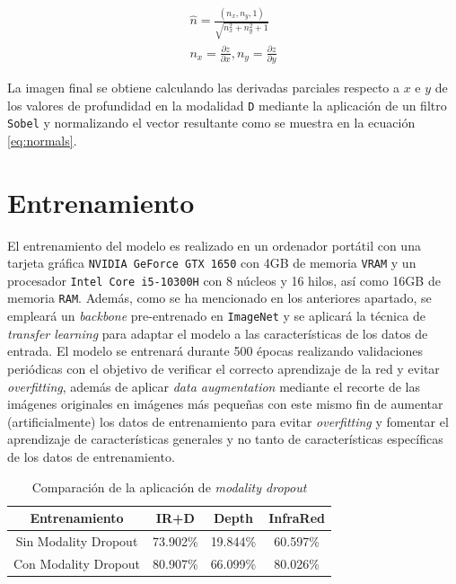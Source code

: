 \documentclass[12pt,a4paper]{report}
\begin{document}
\begin{equation}
    \begin{aligned}
        \hat{n} = \frac{(n_x, n_y, 1)}{\sqrt{n_x^2 + n_y^2 + 1}} \\
        n_x = \frac{\partial z}{\partial x}, n_y = \frac{\partial z}{\partial y} 
    \end{aligned}
    \label{eq:normals}
\end{equation}

La imagen final se obtiene calculando las derivadas parciales respecto a $x$ e $y$ de los valores de profundidad en la modalidad \texttt{D} mediante la aplicación de un filtro \texttt{Sobel} y normalizando el vector resultante como se muestra en la ecuación \ref{eq:normals}.

\section{Entrenamiento}
\label{sec:cmx_training}
El entrenamiento del modelo es realizado en un ordenador portátil con una tarjeta gráfica \texttt{NVIDIA GeForce GTX 1650} con 4GB de memoria \texttt{VRAM} y un procesador \texttt{Intel Core i5-10300H} con 8 núcleos y 16 hilos, así como 16GB de memoria \texttt{RAM}. Además, como se ha mencionado en los anteriores apartado, se empleará un \textit{backbone} pre-entrenado en \texttt{ImageNet} y se aplicará la técnica de \textit{transfer learning} para adaptar el modelo a las características de los datos de entrada. El modelo se entrenará durante 500 épocas realizando validaciones periódicas con el objetivo de verificar el correcto aprendizaje de la red y evitar \textit{overfitting}, además de aplicar \textit{data augmentation} mediante el recorte de las imágenes originales en imágenes más pequeñas con este mismo fin de aumentar (artificialmente) los datos de entrenamiento para evitar \textit{overfitting} y fomentar el aprendizaje de características generales y no tanto de características específicas de los datos de entrenamiento.

\begin{table}[!h]
    \centering
    \begin{tabular}{|c|c|c|c|}
        \hline
        \textbf{Entrenamiento} & \textbf{IR+D} & \textbf{Depth} & \textbf{InfraRed} \\
        \hline
        Sin Modality Dropout & 73.902\% & 19.844\% & 60.597\% \\
        Con Modality Dropout & 80.907\% & 66.099\% & 80.026\% \\
        \hline
    \end{tabular}
    \caption{Comparación de la aplicación de \textit{modality dropout}}
    \label{tab:modality_dropout_comparison}
\end{table}
\end{document}
